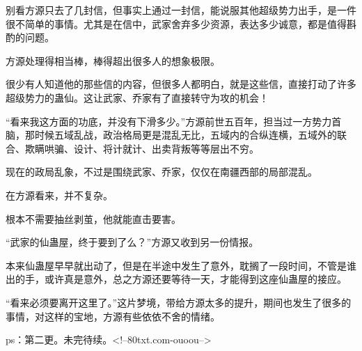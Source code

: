 \begin{this_body}
别看方源只去了几封信，但事实上通过一封信，能说服其他超级势力出手，是一件很不简单的事情。尤其是在信中，武家舍弃多少资源，表达多少诚意，都是值得斟酌的问题。

方源处理得相当棒，棒得超出很多人的想象极限。

很少有人知道他的那些信的内容，但很多人都明白，就是这些信，直接打动了许多超级势力的蛊仙。这让武家、乔家有了直接转守为攻的机会！

“看来我这方面的功底，并没有下滑多少。”方源前世五百年，担当过一方势力首脑，那时候五域乱战，政治格局更是混乱无比，五域内的合纵连横，五域外的联合、欺瞒哄骗、设计、将计就计、出卖背叛等等层出不穷。

现在的政局乱象，不过是围绕武家、乔家，仅仅在南疆西部的局部混乱。

在方源看来，并不复杂。

根本不需要抽丝剥茧，他就能直击要害。

“武家的仙蛊屋，终于要到了么？”方源又收到另一份情报。

本来仙蛊屋早早就出动了，但是在半途中发生了意外，耽搁了一段时间，不管是谁出的手，或许真是意外，总之方源还要等待一天，才能得到这座仙蛊屋的接应。

“看来必须要离开这里了。”这片梦境，带给方源太多的提升，期间也发生了很多的事情，对这样的宝地，方源有些依依不舍的情绪。

ps：第二更。未完待续。<!--80txt.com-ouoou-->

\end{this_body}

